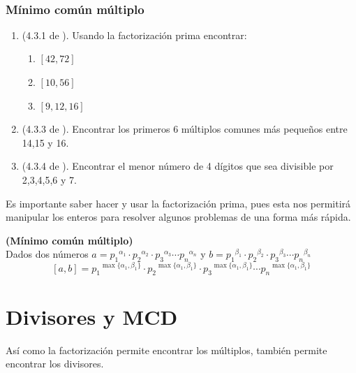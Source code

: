 \newpage
\begin{exers}{\ \\}
	\begin{center}
		\vspace{-1cm}
		\subsubsection*{ Mínimo común múltiplo }\label{ejercicios_subsubsection_MCM}
	\end{center}

	\begin{enumerate}
	\item (4.3.1 de \cite{Aops_TN}). Usando la factorización prima encontrar:
				\begin{enumerate}[label=\Alph*)]
					\item $[42,72]$
					\item $[10,56]$
					\item $[9,12,16]$		
				\end{enumerate}
	\item (4.3.3 de \cite{Aops_TN}). Encontrar los primeros 6 múltiplos comunes más pequeños entre 14,15 y 16.
	\item (4.3.4 de \cite{Aops_TN}). Encontrar el menor número de 4 dígitos que sea divisible por 2,3,4,5,6 y 7.
	
	
	\end{enumerate}
\end{exers}
\newpage


Es importante saber hacer y usar la factorización prima, pues esta nos permitirá manipular los enteros para resolver algunos problemas de una forma más rápida. 

\begin{prop}\textbf{(Mínimo común múltiplo)}\\
Dados dos números $a={p_1}^{\alpha_1} \cdot {p_2}^{\alpha_2} \cdot {p_3}^{\alpha_3} \cdots {p_n}^{\alpha_n}$ y $b={p_1}^{\beta_1} \cdot {p_2}^{\beta_2} \cdot {p_3}^{\beta_3} \cdots {p_n}^{\beta_n}$
\[
[a,b]= {p_1}^{\max\{\alpha_1,\beta_1\}} \cdot {p_2}^{\max\{\alpha_1,\beta_1\}} \cdot {p_3}^{\max\{\alpha_1,\beta_1\}} \cdots {p_n}^{\max\{\alpha_1,\beta_1\}}
\]
\end{prop}


\section{Divisores y MCD}\label{section_Divisores_y_MCD}

Así como la factorización permite encontrar los múltiplos, también permite encontrar los divisores.

